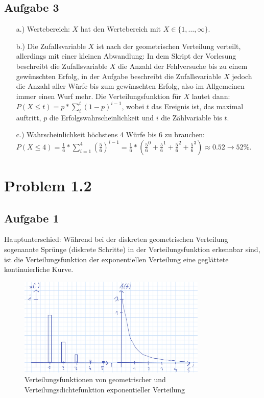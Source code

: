 \documentclass[%
10pt,              %
ngerman,           %
a4paper,           %
DIV11,             %
]{scrartcl}%
\begin{document}
\subsection*{Aufgabe 3}

\begin{itemize}
	\item[a.)] Wertebereich: $X$ hat den Wertebereich mit $X \in \{1, \dots, \infty \}$.
	\item[b.)] Die Zufallsvariable $X$ ist nach der geometrischen Verteilung verteilt, allerdings mit einer kleinen Abwandlung: In dem Skript der Vorlesung beschreibt die Zufallsvariable $X$ die Anzahl der Fehlversuche bis zu einem gewünschten Erfolg, in der Aufgabe beschreibt die Zufallsvariable $X$ jedoch die Anzahl aller Würfe bis zum gewünschten Erfolg, also im Allgemeinen immer einen Wurf mehr. Die Verteilungsfunktion für $X$ lautet dann: $P(X \leq t) = p * \sum_{i}^{t} (1-p)^{i-1}$, wobei $t$ das Ereignis ist, das maximal auftritt, $p$ die Erfolgswahrscheinlichkeit und $i$ die Zählvariable bis $t$. 
	\item[c.)] Wahrscheinlichkeit höchstens 4 Würfe bis 6 zu brauchen:\newline
	$P(X \leq 4) = \frac{1}{6} * \sum_{i = 1}^{4} (\frac{5}{6})^{i-1} = \frac{1}{6} * ( \frac{5}{6}^0 + \frac{5}{6}^1 + \frac{5}{6}^2 + \frac{5}{6}^3) \approx 0.52 \rightarrow 52\%$.
\end{itemize}

\section*{Problem 1.2}

\subsection*{Aufgabe 1}

Hauptunterschied: Während bei der diskreten geometrischen Verteilung sogenannte Sprünge (diskrete Schritte) in der Verteilungsfunktion erkennbar sind, ist die Verteilungsfunktion der exponentiellen Verteilung eine geglättete kontinuierliche Kurve. 

\begin{figure}[!htbp]
	\centering
	\caption{Verteilungsfunktionen von geometrischer und Verteilungsdichtefunktion exponentieller Verteilung}
	\includegraphics[width=0.8\textwidth]{a4vert}
\end{figure}
\end{document}
